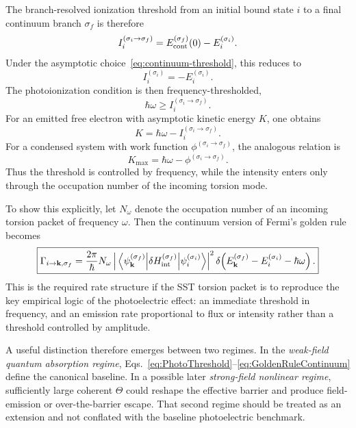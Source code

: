 \documentclass[11pt,a4paper]{article}
\begin{document}
The branch-resolved ionization threshold from an initial bound state $i$ to a final continuum branch $\sigma_f$ is therefore
\begin{equation}
\label{eq:IonizationThresholdGeneral}
I_i^{(\sigma_i\to \sigma_f)}
=
E_{\rm cont}^{(\sigma_f)}(0)-E_i^{(\sigma_i)}.
\end{equation}
Under the asymptotic choice~\eqref{eq:continuum-threshold}, this reduces to
\begin{equation}
\label{eq:IonizationThresholdSimple}
I_i^{(\sigma_i)}=-E_i^{(\sigma_i)}.
\end{equation}
The photoionization condition is then frequency-thresholded,
\begin{equation}
\label{eq:PhotoThreshold}
\boxed{
\hbar\omega \ge I_i^{(\sigma_i\to \sigma_f)}.
}
\end{equation}
For an emitted free electron with asymptotic kinetic energy $K$, one obtains
\begin{equation}
\label{eq:KineticEnergyAtom}
\boxed{
K
=
\hbar\omega - I_i^{(\sigma_i\to \sigma_f)}.
}
\end{equation}
For a condensed system with work function $\phi^{(\sigma_i\to \sigma_f)}$, the analogous relation is
\begin{equation}
\label{eq:PhotoelectricSolid}
\boxed{
K_{\max}
=
\hbar\omega - \phi^{(\sigma_i\to \sigma_f)}.
}
\end{equation}
Thus the threshold is controlled by frequency, while the intensity enters only through the occupation number of the incoming torsion mode.

To show this explicitly, let $N_\omega$ denote the occupation number of an incoming torsion packet of frequency $\omega$. Then the continuum version of Fermi's golden rule becomes
\begin{equation}
\label{eq:GoldenRuleContinuum}
\boxed{
\Gamma_{i\to \mathbf k,\sigma_f}
=
\frac{2\pi}{\hbar}
N_\omega
\left|
\matrixel{\psi_{\mathbf k}^{(\sigma_f)}}{\delta H_{\rm int}^{(\sigma_f)}}{\psi_i^{(\sigma_i)}}
\right|^2
\delta\!\left(
E_{\mathbf k}^{(\sigma_f)}-E_i^{(\sigma_i)}-\hbar\omega
\right).
}
\end{equation}
This is the required rate structure if the SST torsion packet is to reproduce the key empirical logic of the photoelectric effect: an immediate threshold in frequency, and an emission rate proportional to flux or intensity rather than a threshold controlled by amplitude.

A useful distinction therefore emerges between two regimes. In the \emph{weak-field quantum absorption regime}, Eqs.~\eqref{eq:PhotoThreshold}--\eqref{eq:GoldenRuleContinuum} define the canonical baseline. In a possible later \emph{strong-field nonlinear regime}, sufficiently large coherent $\Theta$ could reshape the effective barrier and produce field-emission or over-the-barrier escape. That second regime should be treated as an extension and not conflated with the baseline photoelectric benchmark.
\end{document}
